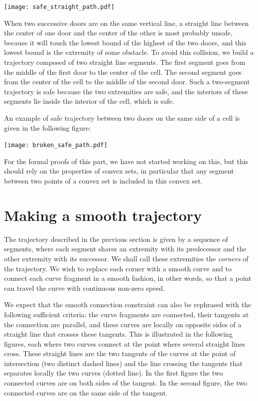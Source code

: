 \documentclass{easychair}
\begin{document}
\begin{center}
\texttt{[image: safe\_straight\_path.pdf]}
\end{center}

When two successive doors are on the same vertical line, a straight
line between the center of one door and the center of the other is
most probably unsafe, because it will touch the lowest bound of the
highest of the two doors, and this lowest bound is the extremity of
some obstacle.  To avoid this collision, we build a trajectory composed of
two straight line segments.  The first segment goes from the middle of
the first door to the center of the cell.  The second segment goes
from the center of the cell to the middle of the second door.  Such a
two-segment trajectory is safe because the two extremities are safe, and the
interiors of these segments lie inside the interior of the cell, which is
safe.

An example of safe trajectory between two doors on the same side of a cell is
given in the following figure:
\begin{center}
\texttt{[image: broken\_safe\_path.pdf]}
\end{center}

For the formal proofs of this part, we have not started working on
this, but this should rely on the properties of convex sets, in
particular that any segment between two points of a convex set is
included in this convex set.

\section{Making a smooth trajectory}
The trajectory described in the previous section is given by a
sequence of segments, where each segment shares an extremity with its
predecessor and the other extremity with its successor.  We shall call
these extremities the {\em corners} of the trajectory.  We wish to
replace each corner with a smooth curve and to connect each curve fragment in
a smooth fashion, in other words, so that a point can travel the curve with
continuous non-zero speed.

We expect that the smooth connection constraint can also be rephrased
with the following sufficient criteria: the curve fragments are connected,
their tangents at the connection are parallel, and these curves are
locally on opposite sides of a straight line that crosses these
tangents.  This is illustrated in the following figures, each where
two curves connect at the point where several straight lines cross.
These straight lines are the two tangents of the curves at the point of
intersection (two distinct dashed lines) and the line crossing the
tangents that separates locally the two curves (dotted line).  In the
first figure the two connected curves are on both sides of the tangent.
In the second figure, the two connected curves are on the same side of the
tangent.
\end{document}

